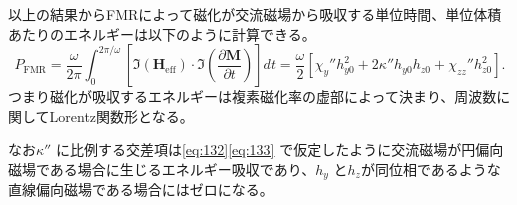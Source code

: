 \documentclass[dvipdfmx]{jsreport}
\numberwithin{equation}{chapter}
\numberwithin{table}{chapter}
\begin{document}
以上の結果からFMRによって磁化が交流磁場から吸収する単位時間、単位体積あたりのエネルギーは以下のように計算できる\cite{ku}。
\begin{equation}
\label{eq:147}
	P_\text{FMR} =\frac{\omega}{2\pi }\int_{0}^{2\pi  /\omega}  \left[ \Im(\bm{H}_\text{eff}) \cdot \Im\left( \frac{\partial \bm{M}}{\partial t}  \right)   \right] dt=\frac{\omega}{2}\left[ \chi_{y}''h^2_{y0}+2\kappa'' h_{y0}h_{z 0}+\chi_{zz}''h^2_{z 0} \right] 
.\end{equation}
つまり磁化が吸収するエネルギーは複素磁化率の虚部によって決まり、周波数に関してLorentz関数形となる。

なお$\kappa''$ に比例する交差項は\eqref{eq:132}\eqref{eq:133}
で仮定したように交流磁場が円偏向磁場である場合に生じるエネルギー吸収であり、$h_y$ と$h_z$が同位相であるような直線偏向磁場である場合にはゼロになる。
\end{document}

